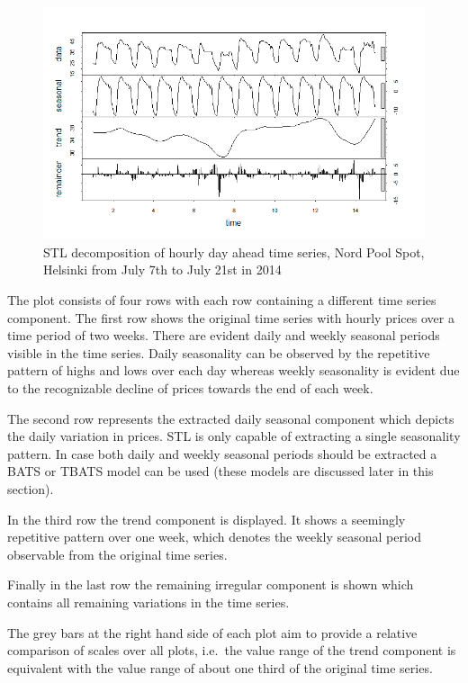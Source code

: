 \begin{figure}[htbp]
	\centering
		\includegraphics[width=1.00\textwidth]{figures/forecasting/stl_decomposition_July_2014.png}
	\caption{STL decomposition of hourly day ahead time series, Nord Pool Spot, Helsinki from July 7th to July 21st in 2014}	
	\label{fig:stl_decomposition_July_2014}
\end{figure}

The plot consists of four rows with each row containing a different time series component. 
The first row shows the original time series with hourly prices over a time period of two weeks. There are evident daily and weekly seasonal periods visible in the time series. Daily seasonality can be observed by the repetitive pattern of highs and lows over each day whereas weekly seasonality is evident due to the recognizable decline of prices towards the end of each week. 

The second row represents the extracted daily seasonal component which depicts the daily variation in prices. STL is only capable of extracting a single seasonality pattern. In case both daily and weekly seasonal periods should be extracted a BATS or TBATS model can be used (these models are discussed later in this section). 

In the third row the trend component is displayed. It shows a seemingly repetitive pattern over one week, which denotes the weekly seasonal period observable from the original time series. 

Finally in the last row the remaining irregular component is shown which contains all remaining variations in the time series. 

The grey bars at the right hand side of each plot aim to provide a relative comparison of scales over all plots, i.e.~the value range of the trend component is equivalent with the value range of about one third of the original time series. 




